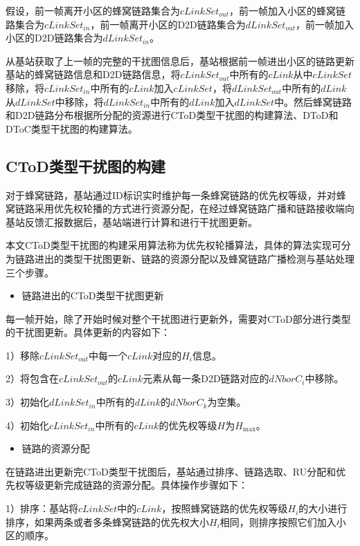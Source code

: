 \documentclass[figurelist,tablelist,algorithmlist,nomlist,masters]{seuthesix}
\begin{document}
	假设，前一帧离开小区的蜂窝链路集合为$cLinkSet_{out}$，前一帧加入小区的蜂窝链路集合为$cLinkSet_{in}$，前一帧离开小区的D2D链路集合为$dLinkSet_{out}$，前一帧加入小区的D2D链路集合为$dLinkSet_{in}$。

	从基站获取了上一帧的完整的干扰图信息后，基站根据前一帧进出小区的链路更新基站的蜂窝链路信息和D2D链路信息，将$cLinkSet_{out}$中所有的$cLink$从中$cLinkSet$移除，将$cLinkSet_{in}$中所有的$cLink$加入$cLinkSet$，将$dLinkSet_{out}$中所有的$dLink$从$dLinkSet$中移除，将$dLinkSet_{in}$中所有的$dLink$加入$dLinkSet$中。然后蜂窝链路和D2D链路分布根据所分配的资源进行CToD类型干扰图的构建算法、DToD和DToC类型干扰图的构建算法。

	\subsection{CToD类型干扰图的构建}

	对于蜂窝链路，基站通过ID标识实时维护每一条蜂窝链路的优先权等级，并对蜂窝链路采用优先权轮播的方式进行资源分配，在经过蜂窝链路广播和链路接收端向基站反馈汇报数据后，基站端进行计算和进行干扰图更新。

	本文CToD类型干扰图的构建采用算法称为优先权轮播算法，具体的算法实现可分为链路进出的类型干扰图更新、链路的资源分配以及蜂窝链路广播检测与基站处理三个步骤。

	\begin{itemize}
		\item 链路进出的CToD类型干扰图更新
	\end{itemize}

	每一帧开始，除了开始时候对整个干扰图进行更新外，需要对CToD部分进行类型的干扰图更新。具体更新的内容如下：

	1）移除$cLinkSet_{out}$中每一个$cLink$对应的${H_i}$信息。

	2）将包含在$cLinkSet_{out}$的$cLink$元素从每一条D2D链路对应的$dNborC_i$中移除。

	3）初始化$dLinkSet_{in}$中所有的$dLink$的$dNborC_k$为空集。

	4）初始化$cLinkSet_{in}$中所有的$cLink$的优先权等级${H}$为${H_{\max }}$。

	\begin{itemize}
		\item 链路的资源分配
	\end{itemize}

	在链路进出更新完CToD类型干扰图后，基站通过排序、链路选取、RU分配和优先权等级更新完成链路的资源分配。具体操作步骤如下：

	1）排序：基站将$cLinkSet$中的$cLink$，按照蜂窝链路的优先权等级${H_i}$的大小进行排序，如果两条或者多条蜂窝链路的优先权大小${H_i}$相同，则排序按照它们加入小区的顺序。
\end{document}
